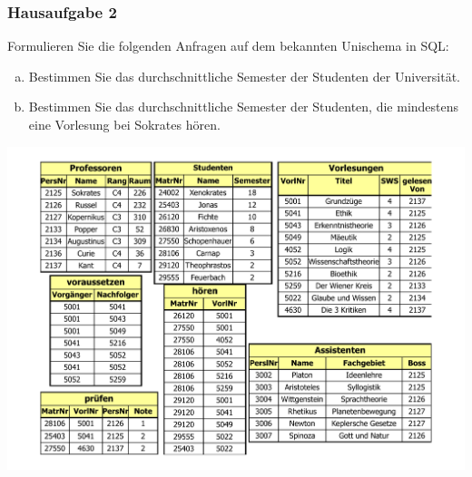 \begin{frame}
	\frametitle{Hausaufgabe 2}
	\vspace{0.5cm}

	\begin{multicols}{2}
		Formulieren Sie die folgenden Anfragen auf dem bekannten Unischema in SQL:
		\begin{enumerate}[a)]
			\item Bestimmen Sie das durchschnittliche Semester der Studenten der Universität.
			\item Bestimmen Sie das durchschnittliche Semester der Studenten, die mindestens eine Vorlesung bei Sokrates hören.
		\end{enumerate}
		\vfill\columnbreak

		\begin{center}
			\includegraphics[height=.6\paperheight]{../img/uni.pdf}
		\end{center}
	\end{multicols}
\end{frame}

